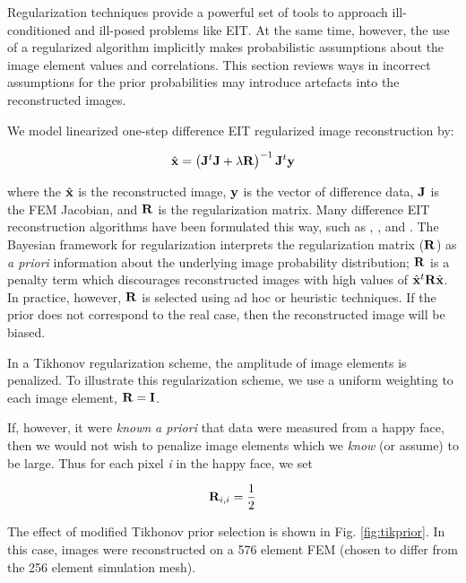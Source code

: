 \documentclass[12pt]{iopart}
\begin{document}
Regularization techniques provide a powerful set of tools
to approach ill-conditioned and ill-posed problems like
EIT. At the same time, however, the use of a regularized
algorithm implicitly makes probabilistic assumptions
about the image element values and correlations. 
This section reviews ways in incorrect assumptions for
the prior probabilities may introduce artefacts into 
the reconstructed images.

We model linearized one-step difference
EIT regularized image reconstruction
by:

\begin{equation}
   \hat{\bf x} = 
   \left({\bf J}^t{\bf J} + \lambda{\bf R}\right)^{-1}
         {\bf J}^t{\bf y}
\end{equation}

where the $\hat{\bf x}$ is the reconstructed image, 
$\bf y$ is the vector of difference data,
$\bf J$ is the FEM Jacobian, 
and $\bf R$ is the regularization matrix. Many 
difference EIT reconstruction algorithms have been
formulated this way, such as
\cite{Cheney_etal_1990}, \cite{Adler_and_Guardo_1996},
and \cite{Polydorides_2002}.
The Bayesian framework for regularization interprets
the regularization matrix ($\bf R$) as {\em a priori} information 
about the underlying image probability distribution;
$\bf R$ is a penalty term which discourages reconstructed
images with high values of $\hat{\bf x}^t{\bf R}\hat{\bf x}$.
In practice, however, $\bf R$ is selected using
ad hoc or heuristic techniques. If the prior does
not correspond to the real case, then the reconstructed
image will be biased.

In a Tikhonov regularization scheme, the amplitude
of image elements is penalized. To illustrate
this regularization scheme, we use a uniform
weighting to each image element, ${\bf R} = {\bf I}$.

If, however, it were {\em known} {\em a priori} that 
data were measured from a happy face, then we 
would not wish to penalize image elements which we
{\em know} (or assume) to be large. Thus for each pixel {\em i}
in the happy face, we set 

\begin{equation}
   {\bf R}_{i,i} = \frac{1}{2}
\end{equation}

The effect of modified Tikhonov prior selection is shown in
Fig. \ref{fig:tikprior}.
In this case, images were reconstructed on a 576 element
FEM (chosen to differ from the 256 element simulation mesh).
\end{document}
